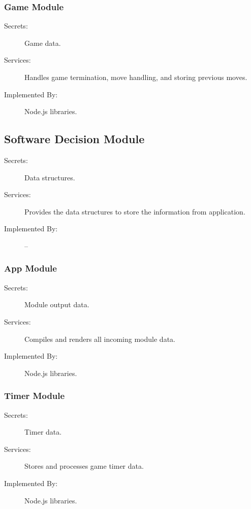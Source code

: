 \documentclass[12pt, titlepage]{article}
\begin{document}
    \subsubsection{Game Module \label{mGame}}
    \begin{description}
    \item[Secrets:] Game data.
    \item[Services:] Handles game termination, move handling, and storing previous moves.
    \item[Implemented By:] Node.js libraries.
    \end{description}
    
\subsection{Software Decision Module \label{mSH}}
\begin{description}
\item[Secrets:] Data structures.
\item[Services:] Provides the data structures to store the information from application.
\item[Implemented By:] --
\end{description}

    \subsubsection{App Module \label{mApp}}
    \begin{description}
    \item[Secrets:] Module output data.
    \item[Services:] Compiles and renders all incoming module data.
    \item[Implemented By:] Node.js libraries.
    \end{description}
    
    \subsubsection{Timer Module \label{mTimer}}
    \begin{description}
    \item[Secrets:] Timer data.
    \item[Services:] Stores and processes game timer data.
    \item[Implemented By:] Node.js libraries.
    \end{description}
    
\end{document}
